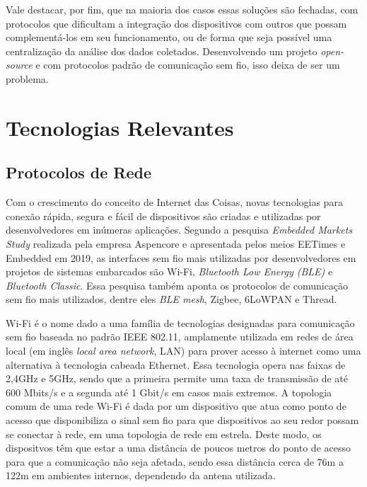 \documentclass[../monografia.tex]{subfiles}
\begin{document}
Vale destacar, por fim, que na maioria dos casos essas soluções são fechadas, com protocolos que dificultam a integração dos dispositivos com outros que possam complementá-los em seu funcionamento, ou de forma que seja possível uma centralização da análise dos dados coletados. Desenvolvendo um projeto \textit{open-source} e com protocolos padrão de comunicação sem fio, isso deixa de ser um problema. 

\section{Tecnologias Relevantes} 
\subsection{Protocolos de Rede} 

Com o crescimento do conceito de Internet das Coisas, novas tecnologias para conexão rápida, segura e fácil de dispositivos são criadas e utilizadas por desenvolvedores em inúmeras aplicações. Segundo a pesquisa \textit{Embedded Markets Study} realizada pela empresa Aspencore\cite{embedded-market-study} e apresentada pelos meios EETimes\cite{eetimes} e Embedded\cite{embedded} em 2019, as interfaces sem fio mais utilizadas por desenvolvedores em  projetos de sistemas embarcados são Wi-Fi, \textit{Bluetooth Low Energy (BLE)} e \textit{Bluetooth Classic}. Essa pesquisa também aponta os protocolos de comunicação sem fio mais utilizados, dentre eles \textit{BLE mesh}, Zigbee, 6LoWPAN e Thread. 

Wi-Fi é o nome dado a uma família de tecnologias designadas para comunicação sem fio baseada no padrão IEEE 802.11\cite{802.11}, amplamente utilizada em redes de área local (em inglês \textit{local area network}, LAN) para prover acesso à internet como uma alternativa à tecnologia cabeada Ethernet. Essa tecnologia opera nas faixas de 2,4GHz e 5GHz, sendo que a primeira permite uma taxa de transmissão de até 600 Mbits/s e a segunda até 1 Gbit/s em casos mais extremos\cite{Wi-Fi-datarate}. A topologia comum de uma rede Wi-Fi é dada por um  dispositivo que atua como ponto de acesso que disponibiliza o sinal sem fio para que dispositivos ao seu redor possam se conectar à rede, em uma topologia de rede em estrela. Deste modo, os dispositvos têm que estar a uma distância de poucos metros do ponto de acesso para que a comunicação não seja afetada, sendo essa distância cerca de 76m a 122m em ambientes internos\cite{wifi-range}, dependendo da antena utilizada.
\end{document}
